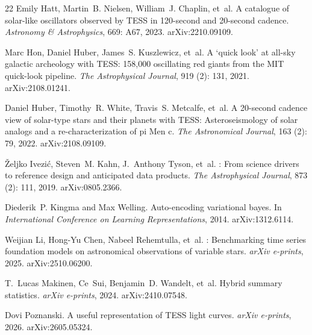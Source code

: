 \documentclass{article}
\begin{document}
\begin{thebibliography}{22}
Emily Hatt, Martin~B. Nielsen, William~J. Chaplin, et~al.
\newblock A catalogue of solar-like oscillators observed by {TESS} in
  120-second and 20-second cadence.
\newblock \emph{Astronomy \& Astrophysics}, 669: A67, 2023.
\newblock arXiv:2210.09109.

Marc Hon, Daniel Huber, James~S. Kuszlewicz, et~al.
\newblock A `quick look' at all-sky galactic archeology with {TESS}: 158,000
  oscillating red giants from the {MIT} quick-look pipeline.
\newblock \emph{The Astrophysical Journal}, 919 (2): 131,
  2021.
\newblock arXiv:2108.01241.

Daniel Huber, Timothy~R. White, Travis~S. Metcalfe, et~al.
\newblock A 20-second cadence view of solar-type stars and their planets with
  {TESS}: Asteroseismology of solar analogs and a re-characterization of pi
  {Men} c.
\newblock \emph{The Astronomical Journal}, 163 (2): 79, 2022.
\newblock arXiv:2108.09109.

\v{Z}eljko Ivezi\'{c}, Steven~M. Kahn, J.~Anthony Tyson, et~al.
: From science drivers to reference design and anticipated data
  products.
\newblock \emph{The Astrophysical Journal}, 873 (2): 111,
  2019.
\newblock arXiv:0805.2366.

Diederik~P. Kingma and Max Welling.
\newblock Auto-encoding variational bayes.
\newblock In \emph{International Conference on Learning Representations}, 2014.
\newblock arXiv:1312.6114.

Weijian Li, Hong-Yu Chen, Nabeel Rehemtulla, et~al.
: Benchmarking time series foundation models on
  astronomical observations of variable stars.
\newblock \emph{arXiv e-prints}, 2025.
\newblock arXiv:2510.06200.

T.~Lucas Makinen, Ce~Sui, Benjamin~D. Wandelt, et~al.
\newblock Hybrid summary statistics.
\newblock \emph{arXiv e-prints}, 2024.
\newblock arXiv:2410.07548.

Dovi Poznanski.
\newblock A useful representation of {TESS} light curves.
\newblock \emph{arXiv e-prints}, 2026.
\newblock arXiv:2605.05324.


\end{thebibliography}
\end{document}
